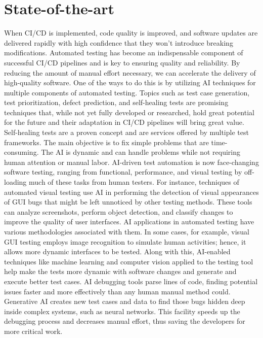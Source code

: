 \section{State-of-the-art}%
\label{sec:State-of-the-art}
When CI/CD is implemented, code quality is improved, and software updates are delivered rapidly with high confidence that they won't introduce breaking modifications.
Automated testing has become an indispensable component of successful CI/CD pipelines and is key to ensuring quality and reliability.
By reducing the amount of manual effort necessary, we can accelerate the delivery of high-quality software.
One of the ways to do this is by utilizing AI techniques for multiple components of automated testing.
Topics such as test case generation, test prioritization, defect prediction, and self-healing tests are promising techniques that, while not yet fully developed or researched, hold great potential for the future and their adaptation in CI/CD pipelines will bring great value. 
\autocite{Kaniganti}
Self-healing tests are a proven concept and are services offered by multiple test frameworks. The main objective is to fix simple problems that are time-consuming. The AI is dynamic and can handle problems while not requiring human attention or manual labor.\autocite{Shabarish2024}
AI-driven test automation is now face-changing software testing, ranging from functional, performance, and visual testing by off-loading much of these tasks from human testers. For instance, techniques of automated visual testing use AI in performing the detection of visual appearances of GUI bugs that might be left unnoticed by other testing methods. These tools can analyze screenshots, perform object detection, and classify changes to improve the quality of user interfaces.
\autocite{Gamal2023}
AI applications in automated testing have various methodologies associated with them. In some cases, for example, visual GUI testing employs image recognition to simulate human activities; hence, it allows more dynamic interfaces to be tested.
\autocite{BaniMuhamad2016}
Along with this, AI-enabled techniques like machine learning and computer vision applied to the testing tool help make the tests more dynamic with software changes and generate and execute better test cases.
\autocite{Trudova.2020}
AI debugging tools parse lines of code, finding potential issues faster and more effectively than any human manual method could. Generative AI creates new test cases and data to find those bugs hidden deep inside complex systems, such as neural networks.
\autocite{Staron2024}
This facility speeds up the debugging process and decreases manual effort, thus saving the developers for more critical work.
